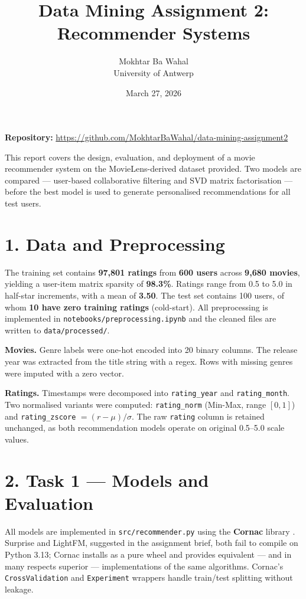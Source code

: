 \documentclass[11pt,a4paper]{article}
\title{\textbf{Data Mining Assignment 2: Recommender Systems}}
\author{Mokhtar Ba Wahal\\ University of Antwerp}
\date{March 27, 2026}
\begin{document}
\maketitle

\textbf{Repository:} \url{https://github.com/MokhtarBaWahal/data-mining-assignment2}

This report covers the design, evaluation, and deployment of a movie recommender system on the MovieLens-derived dataset provided. Two models are compared — user-based collaborative filtering and SVD matrix factorisation — before the best model is used to generate personalised recommendations for all test users.

\section*{1. Data and Preprocessing}

The training set contains \textbf{97,801 ratings} from \textbf{600 users} across \textbf{9,680 movies}, yielding a user-item matrix sparsity of \textbf{98.3\%}. Ratings range from 0.5 to 5.0 in half-star increments, with a mean of \textbf{3.50}. The test set contains 100 users, of whom \textbf{10 have zero training ratings} (cold-start). All preprocessing is implemented in \texttt{notebooks/preprocessing.ipynb} and the cleaned files are written to \texttt{data/processed/}.

\textbf{Movies.} Genre labels were one-hot encoded into 20 binary columns. The release year was extracted from the title string with a regex. Rows with missing genres were imputed with a zero vector.

\textbf{Ratings.} Timestamps were decomposed into \texttt{rating\_year} and \texttt{rating\_month}. Two normalised variants were computed: \texttt{rating\_norm} (Min-Max, range $[0,1]$) and \texttt{rating\_zscore} $=(r-\mu)/\sigma$. The raw \texttt{rating} column is retained unchanged, as both recommendation models operate on original 0.5--5.0 scale values.

\section*{2. Task 1 — Models and Evaluation}

All models are implemented in \texttt{src/recommender.py} using the \textbf{Cornac} library \cite{cornac}. Surprise and LightFM, suggested in the assignment brief, both fail to compile on Python 3.13; Cornac installs as a pure wheel and provides equivalent — and in many respects superior — implementations of the same algorithms. Cornac's \texttt{CrossValidation} and \texttt{Experiment} wrappers handle train/test splitting without leakage.
\end{document}
